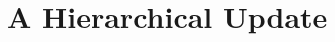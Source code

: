 \documentclass[eikonal.tex]{subfiles}
\begin{document}
\section{A Hierarchical Update}
\end{document}
